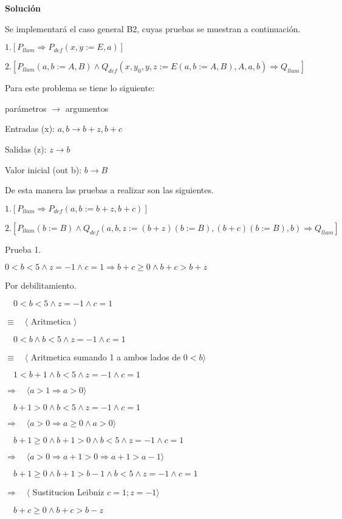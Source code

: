 \documentclass[hidelinks]{article}
\begin{document}
\textbf{Solución} \par

Se implementará el caso general B2, cuyas pruebas se muestran a continuación. \par

$1. [P_{llam} \Rightarrow P_{def}(x,y := E, a)]$ \par
$2. [P_{llam}(a,b := A,B) \land Q_{def}(x,y_0,y,z := E(a,b := A,B), A, a,b) \Rightarrow Q_{llam}]$ \par

Para este problema se tiene lo siguiente: \par

\hspace{6em} parámetros $\rightarrow$ argumentos \par

Entradas (x): $a,b \rightarrow b+z, b+c$ \par
Salidas (z): $z \rightarrow b$ \par
Valor inicial (out b): $b \rightarrow B$ \par

De esta manera las pruebas a realizar son las siguientes. \par

$1. [P_{llam} \Rightarrow P_{def}(a,b := b+z,b+c)]$ \par
$2. [P_{llam}(b := B) \land Q_{def}(a,b,z := (b+z)(b := B), (b+c)(b := B), b) \Rightarrow Q_{llam}]$ \par

Prueba 1. \par
$ 0 < b < 5 \land z = -1 \land c = 1 \Rightarrow b+c \geq 0 \land b+c > b+z$ \par

Por debilitamiento. \par

$ \quad 0 < b < 5 \land z = -1 \land c = 1$ \par
$\equiv \quad \langle$ Aritmetica $\rangle$ \par
$ \quad 0 < b \land b < 5 \land z = -1 \land c = 1$ \par
$\equiv \quad \langle$ Aritmetica sumando 1 a ambos lados de $ 0 < b \rangle$ \par
$ \quad 1 < b+1 \land b < 5 \land z = -1 \land c = 1$ \par
$\Rightarrow \quad \langle a > 1 \Rightarrow a > 0 \rangle$ \par
$ \quad b+1 > 0 \land b < 5 \land z = -1 \land c = 1$ \par
$\Rightarrow \quad \langle a > 0 \Rightarrow a \geq 0 \land a > 0 \rangle$ \par
$ \quad b+1 \geq 0 \land b+1 > 0 \land b < 5 \land z = -1 \land c = 1$ \par
$\Rightarrow \quad \langle a > 0 \Rightarrow a + 1 > 0 \Rightarrow a + 1 > a - 1  \rangle$ \par
$ \quad b+1 \geq 0 \land b+1 > b - 1 \land b < 5 \land z = -1 \land c = 1$ \par
$\Rightarrow \quad \langle$ Sustitucion Leibniz  $c = 1; z = -1\rangle$ \par
$ \quad b+c \geq 0 \land b+c > b - z$ \par
\end{document}
